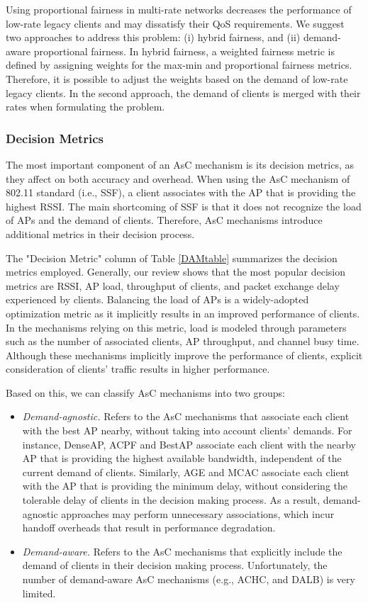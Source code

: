 Using proportional fairness in multi-rate networks decreases the performance of low-rate legacy clients and may dissatisfy their QoS requirements. 
We suggest two approaches to address this problem: (i) hybrid fairness, and (ii) demand-aware proportional fairness. 
In hybrid fairness, a weighted fairness metric is defined by assigning weights for the max-min and proportional fairness metrics. 
Therefore, it is possible to adjust the weights based on the demand of low-rate legacy clients. 
In the second approach, the demand of clients is merged with their rates when formulating the problem.



\subsubsection{\textbf{Decision Metrics}}
\label{asc_dec_met}
The most important component of an AsC mechanism is its decision metrics, as they affect on both accuracy and overhead.
When using the AsC mechanism of 802.11 standard (i.e., SSF), a client associates with the AP that is providing the highest RSSI. 
The main shortcoming of SSF is that it does not recognize the load of APs and the demand of clients.
Therefore, AsC mechanisms introduce additional metrics in their decision process. 

The "Decision Metric" column of Table \ref{DAMtable} summarizes the decision metrics employed.
Generally, our review shows that the most popular decision metrics are RSSI, AP load, throughput of clients, and packet exchange delay experienced by clients. 
Balancing the load of APs is a widely-adopted optimization metric as it implicitly results in an improved performance of clients.
In the mechanisms relying on this metric, load is modeled through parameters such as the number of associated clients, AP throughput, and channel busy time. 
Although these mechanisms implicitly improve the performance of clients, explicit consideration of clients' traffic results in higher performance.

Based on this, we can classify AsC mechanisms into two groups:
%
\begin{itemize}
	\item \textit{Demand-agnostic.} 
	Refers to the AsC mechanisms that associate each client with the best AP nearby, without taking into account clients' demands.
	For instance, DenseAP, ACPF and BestAP associate each client with the nearby AP that is providing the highest available bandwidth, independent of the current demand of clients. 
	Similarly, AGE and MCAC associate each client with the AP that is providing the minimum delay, without considering the tolerable delay of clients in the decision making process. 	
	As a result, demand-agnostic approaches may perform unnecessary associations, which incur handoff overheads that result in performance degradation.	
	
	\item \textit{Demand-aware.}
	Refers to the AsC mechanisms that explicitly include the demand of clients in their decision making process.
	Unfortunately, the number of demand-aware AsC mechanisms (e.g., ACHC, and DALB) is very limited.
\end{itemize}
%

